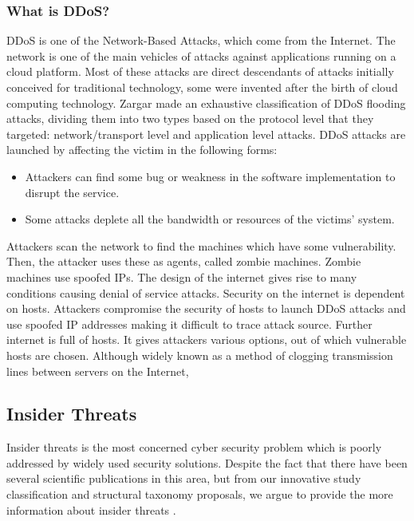 \documentclass[twocolumn]{article}
\begin{document}
\subsubsection{What is DDoS?}
\par DDoS\cite{coppolino2017cloud} is one of the Network-Based Attacks, which come from the Internet. The network is one of the main vehicles of attacks against applications running on a cloud platform. Most of these attacks are direct descendants of attacks initially conceived for traditional technology, some were invented after the birth of cloud computing technology. Zargar\cite{coppolino2017cloud} made an exhaustive classification of DDoS flooding attacks, dividing them into two types based on the protocol level that they targeted: network/transport level and application level attacks. DDoS attacks are launched by affecting the victim in the following forms:
\begin{itemize}
\item Attackers can find some bug or weakness in the software implementation to disrupt the service.
\item Some attacks deplete all the bandwidth or resources of the victims' system.
\end{itemize}
Attackers scan the network to find the machines which have some vulnerability. Then, the attacker uses these as agents, called zombie machines. Zombie machines use spoofed IPs. The design of the internet gives rise to many conditions causing denial of service attacks. Security on the internet is dependent on hosts. Attackers compromise the security of hosts to launch DDoS
attacks and use spoofed IP addresses making it difficult to trace attack source. Further internet is full of hosts. It
gives attackers various options, out of which vulnerable hosts are chosen\cite{deshmukh2015understanding}. Although widely known as a method of clogging transmission lines between servers on the Internet,

\subsection{Insider Threats}
Insider threats is the most concerned cyber security problem which is poorly addressed by widely used security solutions. Despite the fact that there have been several scientific publications in this area, but from our innovative study classification and structural taxonomy proposals, we argue to provide the more information about insider threats \cite{singh2022systematic}.
\end{document}
